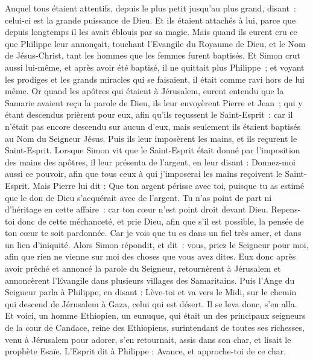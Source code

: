 \begin{multicols}{2}
Auquel tous étaient attentifs, depuis le plus petit jusqu'au plus grand, disant : celui-ci est la grande puissance de Dieu.
Et ils étaient attachés à lui, parce que depuis longtemps il les avait éblouis par sa magie.
Mais quand ils eurent cru ce que Philippe leur annonçait, touchant l’Evangile du Royaume de Dieu, et le Nom de Jésus-Christ, tant les hommes que les femmes furent baptisés.
Et Simon crut aussi lui-même, et après avoir été baptisé, il ne quittait plus Philippe ; et voyant les prodiges et les grands miracles qui se faisaient, il était comme ravi hors de lui même.
Or quand les apôtres qui étaient à Jérusalem, eurent entendu que la Samarie avaient reçu la parole de Dieu, ils leur envoyèrent Pierre et Jean ;
qui y étant descendus prièrent pour eux, afin qu’ils reçussent le Saint-Esprit :
car il n'était pas encore descendu sur aucun d'eux, mais seulement ils étaient baptisés au Nom du Seigneur Jésus.
Puis ils leur imposèrent les mains, et ils reçurent le Saint-Esprit.
Lorsque Simon vit que le Saint-Esprit était donné par l'imposition des mains des apôtres, il leur présenta de l'argent,
en leur disant : Donnez-moi aussi ce pouvoir, afin que tous ceux à qui j'imposerai les mains reçoivent le Saint-Esprit.
Mais Pierre lui dit : Que ton argent périsse avec toi, puisque tu as estimé que le don de Dieu s'acquérait avec de l'argent.
Tu n’as point de part ni d’héritage en cette affaire : car ton cœur n’est point droit devant Dieu.
Repens-toi donc de cette méchanceté, et prie Dieu, afin que s’il est possible, la pensée de ton cœur te soit pardonnée.
Car je vois que tu es dans un fiel très amer, et dans un lien d’iniquité.
Alors Simon répondit, et dit : vous, priez le Seigneur pour moi, afin que rien ne vienne sur moi des choses que vous avez dites.
Eux donc après avoir prêché et annoncé la parole du Seigneur, retournèrent à Jérusalem et annoncèrent l'Evangile dans plusieurs villages des Samaritains.
Puis l'Ange du Seigneur parla à Philippe, en disant : Lève-toi et va vers le Midi, sur le chemin qui descend de Jérusalem à Gaza, celui qui est désert.
Il se leva donc, s'en alla. Et voici, un homme Ethiopien, un eunuque, qui était un des principaux seigneurs de la cour de Candace, reine des Ethiopiens, surintendant de toutes ses richesses, venu à Jérusalem pour adorer,
s’en retournait, assis dans son char, et lisait le prophète Esaïe.
L'Esprit dit à Philippe : Avance, et approche-toi de ce char.

\end{multicols}
